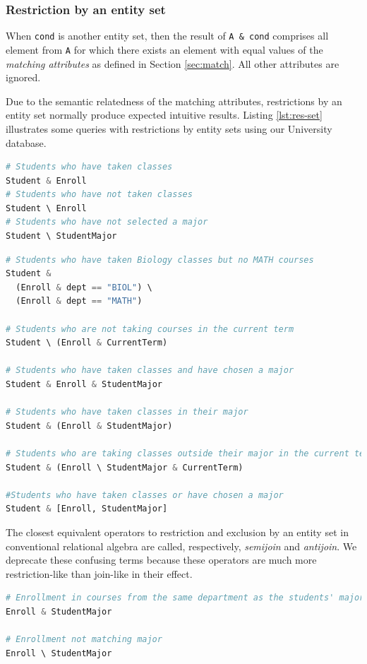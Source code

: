 \documentclass[letter,10pt]{article}
\begin{document}
\subsubsection{Restriction by an entity set}
When \lstinline$cond$ is another entity set, then the result of \lstinline$A & cond$ comprises all element from \lstinline$A$ for which there exists an element with equal values of the \emph{matching attributes}  as defined in Section \ref{sec:match}.  
All other attributes are ignored.  

Due to the semantic relatedness of the matching attributes, restrictions by an entity set normally produce expected intuitive results. 
Listing \ref{lst:res-set} illustrates some queries with restrictions by entity sets using our University database.
\begin{lstlisting}[language=Python, caption={Queries with restrictions by entity sets.}, label={lst:res-set}]
# Students who have taken classes
Student & Enroll
# Students who have not taken classes
Student \ Enroll
# Students who have not selected a major
Student \ StudentMajor
\end{lstlisting}

\begin{lstlisting}[language=Python, caption={Composite restrictions.}, label={lst:res-comp}]
# Students who have taken Biology classes but no MATH courses
Student & 
  (Enroll & dept == "BIOL") \ 
  (Enroll & dept == "MATH")

# Students who are not taking courses in the current term
Student \ (Enroll & CurrentTerm)

# Students who have taken classes and have chosen a major
Student & Enroll & StudentMajor

# Students who have taken classes in their major
Student & (Enroll & StudentMajor)

# Students who are taking classes outside their major in the current term
Student & (Enroll \ StudentMajor & CurrentTerm)

#Students who have taken classes or have chosen a major
Student & [Enroll, StudentMajor]
\end{lstlisting}

The closest equivalent operators to restriction and exclusion by an entity set in conventional relational algebra are called, respectively, \emph{semijoin} and \emph{antijoin}.
We deprecate these confusing terms because these operators are much more restriction-like than join-like in their effect.

\begin{lstlisting}[language=Python, caption={Avoiding unintended restrictions.}, label={lst:res7}]
# Enrollment in courses from the same department as the students' major
Enroll & StudentMajor

# Enrollment not matching major 
Enroll \ StudentMajor 
\end{lstlisting}
\end{document}
